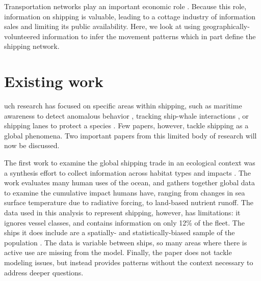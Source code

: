 Transportation networks play an important economic role \citep{canning1993effects}. Because this role, information on shipping is valuable, leading to a cottage industry of information sales and limiting its public availability. Here, we look at using geographically-volunteered information to infer the movement patterns which in part define the shipping network.

\section{Existing work}
uch research has focused on specific areas within shipping, such as maritime awareness to detect anomalous behavior \citep{Tun2007}, tracking ship-whale interactions \citep{jensen2004large}, or shipping lanes to protect a species \citep{Lagueux2011,Mckenna2012a}.  Few papers, however, tackle shipping as a global phenomena. Two important papers from this limited body of research will now be discussed.

The first work %
to examine the global shipping trade in an ecological context was a synthesis effort to collect information across habitat types and impacts \citep{Halpern2008}. The work evaluates many human uses of the ocean, and gathers together global data to examine the cumulative impact humans have, ranging from changes in sea surface temperature due to radiative forcing, to land-based nutrient runoff. The data used in this analysis to represent shipping, however, has limitations: it ignores vessel classes, %
 and contains information on only 12\% of the fleet. The ships it does include are a spatially- and statistically-biased sample of the population \citep{Wang2007}. The data is variable between ships, so many areas where there is active use are missing from the model. Finally, the paper does not tackle modeling issues, but instead provides patterns without the context necessary to address deeper questions. %

